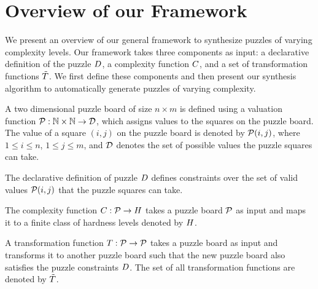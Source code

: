 \section{Overview of our Framework}

We present an overview of our general framework to synthesize puzzles
of varying complexity levels. Our framework takes three components as
input: a declarative definition of the puzzle $D$, a
complexity function $C$, and a set of transformation
functions $\tilde{T}$. We first define these components and
then present our synthesis algorithm to automatically generate
puzzles of varying complexity.

\begin{definition}
A two dimensional puzzle board of size $n \times m$ is defined using a
valuation function $\mathcal{P}: \mathbb{N} \times \mathbb{N}
\rightarrow \mathcal{D}$, which assigns values to the squares on the
puzzle board. The value of a square $(i,j)$ on the puzzle board is denoted by
$\mathcal{P}(i,j)$, where $1 \leq i \leq n$, $1 \leq j \leq m$, and
$\mathcal{D}$ denotes the set of possible values the puzzle
squares can take.
\end{definition}

\begin{definition}
The declarative definition of puzzle $D$ defines constraints over the set of valid values $\mathcal{P}(i,j)$ that the puzzle squares can take.
\end{definition}

\begin{definition}
The complexity function $C : \mathcal{P} \rightarrow
H$ takes a puzzle board $\mathcal{P}$ as input and maps
it to a finite class of hardness levels denoted by $H$.
\end{definition}

\begin{definition}
A transformation function $T : \mathcal{P} \rightarrow
\mathcal{P}$ takes a puzzle board as input and transforms it to
another puzzle board such that the new puzzle board also satisfies the
puzzle constraints $D$. The set of all transformation
functions are denoted by $\tilde{T}$.
\end{definition}

